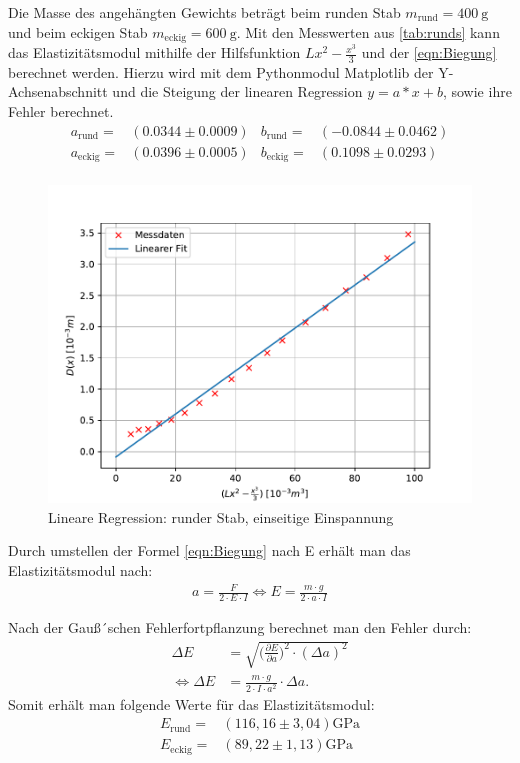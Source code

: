 Die Masse des angehängten Gewichts beträgt beim runden Stab $m_{\text{rund}}=\qty{400}{\g}$ und beim eckigen Stab $m_{\text{eckig}}=\qty{600}{\g}$. Mit den Messwerten aus \autoref{tab:runds}
kann das Elastizitätsmodul mithilfe der Hilfsfunktion $Lx^2-\frac{x^3}{3}$ und der \autoref{eqn:Biegung} berechnet werden.
Hierzu wird mit dem Pythonmodul Matplotlib \cite{matplotlib} der Y-Achsenabschnitt und die Steigung der linearen Regression $y = a*x + b$, 
sowie ihre Fehler berechnet.\\
\begin{align*}
  a_{\text{rund}} =&(0.0344 ± 0.0009) & b_{\text{rund}}=& (-0.0844 ± 0.0462)\\
  a_{\text{eckig}} =&(0.0396 ± 0.0005) & b_{\text{eckig}}=& (0.1098 ± 0.0293)\\
 \end{align*}
\begin{figure}[!htb]
  \centering
  \includegraphics[scale=0.75]{content/plots/runde.pdf}
  \caption{Lineare Regression: runder Stab, einseitige Einspannung}
  \label{fig:LinRegrunde}
\end{figure}
Durch umstellen der Formel \autoref{eqn:Biegung} nach E erhält man das Elastizitätsmodul nach:
\begin{align}
    a = \frac{F}{2 \cdot E \cdot I} \iff E =\frac{m \cdot g}{2 \cdot a \cdot I}\label{eqn:Elamodul.1}
\end{align}


Nach der Gauß´schen Fehlerfortpflanzung berechnet man den Fehler durch:
\begin{equation}
  \begin{aligned}
  \Delta E &= \sqrt{\biggl(\frac{\partial E}{\partial a}\biggr)^2\cdot (\Delta a)^2} \\
  \iff \Delta E &= \frac{m\cdot g}{2\cdot I \cdot a^2} \cdot \Delta a.
  \label{eqn:e-fehler-ein}
  \end{aligned}
  \end{equation}
Somit erhält man folgende Werte für das Elastizitätsmodul:
\begin{align*}
  E_{\text{rund}}=&(116,16\pm3,04)\si{\giga\pascal}\\
  E_{\text{eckig}}=&(89,22\pm1,13)\si{\giga\pascal}\\
  \label{eqn:Eein} 
\end{align*}

